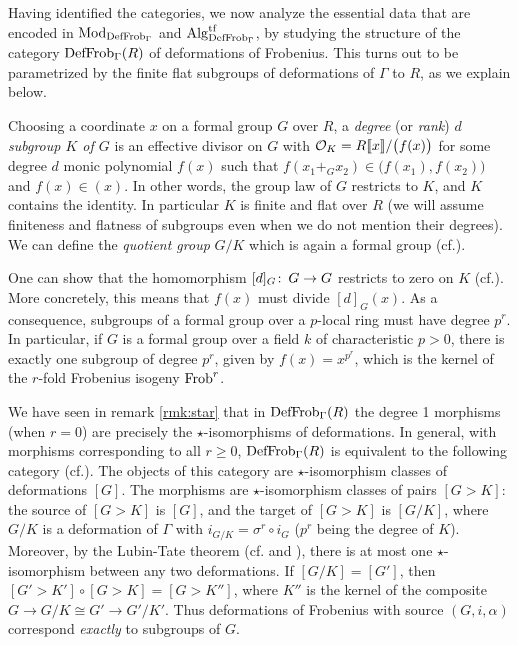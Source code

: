 \documentclass{gtpart}
\theoremstyle{definition}
\theoremstyle{remark}
\def\co{\colon\thinspace}
\newcommand{\Mod}{{\rm Mod}}
\newcommand{\Alg}{{\rm Alg}}
\newcommand{\Frob}{{\rm Frob}}
\newcommand{\CO}{{\cal O}}
\newcommand{\DF}{{{\rm DefFrob}_\Gamma}}
\newcommand{\cff}[2]{cf.\thinspace{\cite[#1]{#2}}}
\begin{document}
Having identified the categories, we now analyze the essential data that are 
encoded in $\Mod_\DF$ and $\Alg_\DF^{\rm tf}$, by studying the structure of 
the category $\DF(R)$ of deformations of Frobenius.  This turns out to be 
parametrized by the finite flat subgroups of deformations of $\Gamma$ to $R$, 
as we explain below.

Choosing a coordinate $x$ on a formal group $G$ over $R$, a {\em degree} (or 
{\em rank}) {\em $d$ subgroup $K$ of $G$} is an effective divisor on $G$ with 
$\CO_K = R \llbracket x \rrbracket / \big(f(x)\big)$ for some degree $d$ monic 
polynomial $f(x)$ such that $f(x_1 +_G x_2) \in \big(f(x_1),f(x_2)\big)$ and 
$f(x) \in (x)$.  In other words, the group law of $G$ restricts to $K$, and 
$K$ contains the identity.  In particular $K$ is finite and flat over $R$ (we 
will assume finiteness and flatness of subgroups even when we do not mention 
their degrees).  We can define the {\em quotient group} $G/K$ which is again a 
formal group (\cff{section 5}{strick}).  

One can show that the homomorphism $[d]_G\co G \to G$ restricts to zero on $K$ 
(\cff{section 1}{tateoort}).  More concretely, this means that $f(x)$ 
must divide $[d]_G(x)$.  As a consequence, subgroups of a formal group over a 
$p$-local ring must have degree $p^r$.  In particular, if $G$ is a formal 
group over a field $k$ of characteristic $p>0$, there is exactly one subgroup 
of degree $p^r$, given by $f(x) = x^{p^r}$, which is the kernel of the 
$r$-fold Frobenius isogeny $\Frob^r$.  

We have seen in remark \ref{rmk:star} that in $\DF(R)$ the degree 1 morphisms 
(when $r = 0$) are precisely the $\star$-isomorphisms of deformations.  In 
general, with morphisms corresponding to all $r \ge 0$, $\DF(R)$ is equivalent 
to the following category (\cff{proposition 16.9}{lpo}).  The objects of this 
category are $\star$-isomorphism classes of deformations $[G]$.  The morphisms 
are $\star$-isomorphism classes of pairs $[G > K]$: the source of $[G > K]$ is 
$[G]$, and the target of $[G > K]$ is $[G/K]$, where $G/K$ is a deformation of 
$\Gamma$ with $i_{G/K} = \sigma^r \circ i_G$ ($p^r$ being the degree of $K$).  
Moreover, by the Lubin-Tate theorem (\cff{theorem 3.1}{lubintate} and 
\cite[section 4.3]{H-Mthm}), there is at most one $\star$-isomorphism between 
any two deformations.  If $[G/K] = [G']$, then 
$[G' > K'] \circ [G > K] = [G > K'']$, where $K''$ is the kernel of the 
composite $G \to G/K \cong G' \to G'/K'$.  Thus deformations of Frobenius with 
source $(G,i,\alpha)$ correspond {\em exactly} to subgroups of $G$.  
\end{document}
